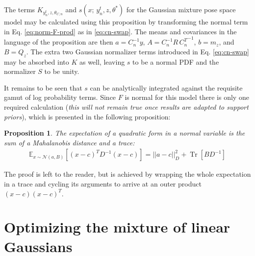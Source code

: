 \documentclass{article}         %
\newtheorem{proposition}{Proposition}[section]
\newcommand{\inv}{^{-1}}
\newcommand{\EE}{\mathbb{E}}
\newcommand{\NN}{\mathcal{N}}
\newcommand{\norm}[1]{\left|\left| #1 \right|\right|}
\newcommand{\pn}[1]{\left( #1 \right)}
\newcommand{\bc}[1]{\left[ #1 \right]}
\DeclareMathOperator{\Tr}{Tr}
\begin{document}
The terms $K_{y^t_n, z, \theta_{C, n}}$ and $s(x;\, y^t_n, z, \theta^*)$ for the Gaussian mixture pose space model may be calculated using this proposition by transforming the normal term in Eq. \ref{eq:norm-F-prod} as in \ref{eq:cn-swap}. The means and covariances in the language of the proposition are then $a = C_n\inv y$, $A = C_n\inv R\, {C_n^T}\inv$, $b = m_z$, and $B = Q_z$. The extra two Gaussian normalizer terms introduced in Eq. \ref{eq:cn-swap} may be absorbed into $K$ as well, leaving $s$ to be a normal PDF and the normalizer $S$ to be unity. 

It remains to be seen that $s$ can be analytically integrated against the requisite gamut of log probability terms. Since $F$ is normal for this model there is only one required calculation (\textit{this will not remain true once results are adapted to support priors}), which is presented in the following proposition:

\begin{proposition}
\label{prop:norm-quad-expect-2}
The expectation of a quadratic form in a normal variable is the sum of a Mahalanobis distance and a trace:
\begin{align}
    \EE_{x\sim\NN(a, B)} \bc{(x - c)^T D\inv (x - c)} = \norm{a - c}^2_D + \Tr\bc{BD\inv}
\end{align}
\end{proposition}
The proof is left to the reader, but is achieved by wrapping the whole expectation in a trace and cycling its arguments to arrive at an outer product $(x - c)(x - c)^T$.



\label{full-model-derivation}
\section{Optimizing the mixture of linear Gaussians}
\end{document}
